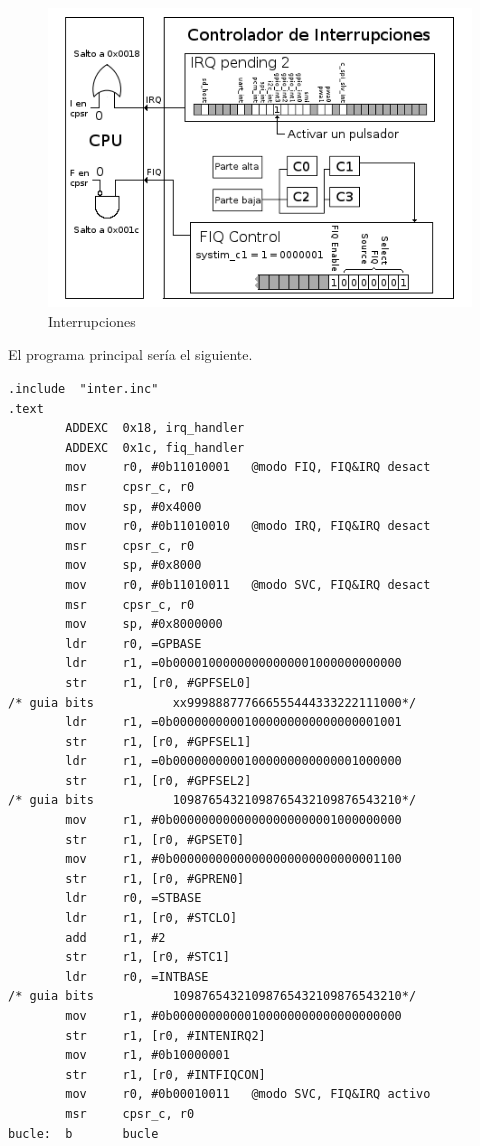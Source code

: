 \begin{figure}[h]
  \centering
    \includegraphics[width=14cm]{graphs/inter6.png}
  \caption{Interrupciones}
  \label{fig:inter6}
\end{figure}

El programa principal sería el siguiente.

\begin{lstlisting}[caption={Programa principal de inter6.s},label={lst:codigoPract5_6}]
        .include  "inter.inc"
.text
        ADDEXC  0x18, irq_handler
        ADDEXC  0x1c, fiq_handler
        mov     r0, #0b11010001   @modo FIQ, FIQ&IRQ desact
        msr     cpsr_c, r0
        mov     sp, #0x4000
        mov     r0, #0b11010010   @modo IRQ, FIQ&IRQ desact
        msr     cpsr_c, r0
        mov     sp, #0x8000
        mov     r0, #0b11010011   @modo SVC, FIQ&IRQ desact
        msr     cpsr_c, r0
        mov     sp, #0x8000000
        ldr     r0, =GPBASE
        ldr     r1, =0b00001000000000000001000000000000
        str     r1, [r0, #GPFSEL0]
/* guia bits           xx999888777666555444333222111000*/
        ldr     r1, =0b00000000001000000000000000001001
        str     r1, [r0, #GPFSEL1]
        ldr     r1, =0b00000000001000000000000001000000
        str     r1, [r0, #GPFSEL2]
/* guia bits           10987654321098765432109876543210*/
        mov     r1, #0b00000000000000000000001000000000
        str     r1, [r0, #GPSET0]
        mov     r1, #0b00000000000000000000000000001100
        str     r1, [r0, #GPREN0]
        ldr     r0, =STBASE
        ldr     r1, [r0, #STCLO]
        add     r1, #2
        str     r1, [r0, #STC1]
        ldr     r0, =INTBASE
/* guia bits           10987654321098765432109876543210*/
        mov     r1, #0b00000000000100000000000000000000
        str     r1, [r0, #INTENIRQ2]
        mov     r1, #0b10000001
        str     r1, [r0, #INTFIQCON]
        mov     r0, #0b00010011   @modo SVC, FIQ&IRQ activo
        msr     cpsr_c, r0
bucle:  b       bucle
\end{lstlisting}


